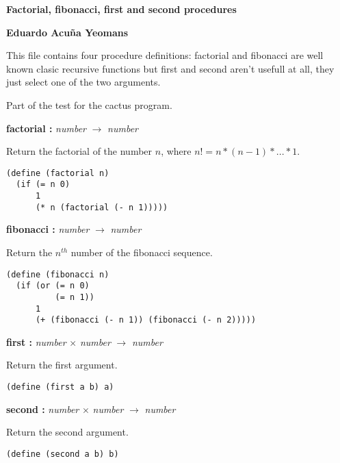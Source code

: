 \documentclass[letterpaper, 12pt]{article}
\begin{document}
\hfill {\LARGE \textbf{Factorial, fibonacci, first and second procedures} }

\bigskip


\hfill {\large \textbf{Eduardo Acuña Yeomans} }

\bigskip


\bigskip

This file contains four procedure definitions:
factorial and fibonacci are well known clasic recursive functions
but first and second aren't usefull at all, they just select one of
the two arguments.

Part of the test for the cactus program.

\bigskip


\bigskip

\bigskip

\textbf{factorial :} \emph{number} $\boldsymbol{\rightarrow}$ \emph{number}


Return the factorial of the number $n$, where
$n! = n*(n-1)*...*1$.
\begin{verbatim}
(define (factorial n)
  (if (= n 0)
      1
      (* n (factorial (- n 1)))))
\end{verbatim}


\bigskip

\bigskip

\textbf{fibonacci :} \emph{number} $\boldsymbol{\rightarrow}$ \emph{number}


Return the $n^{th}$ number of the fibonacci sequence.
\begin{verbatim}
(define (fibonacci n)
  (if (or (= n 0)
          (= n 1))
      1
      (+ (fibonacci (- n 1)) (fibonacci (- n 2)))))
\end{verbatim}


\bigskip

\bigskip

\textbf{first :} \emph{number} $\times$ \emph{number} $\boldsymbol{\rightarrow}$ \emph{number}


Return the first argument.
\begin{verbatim}
(define (first a b) a)
\end{verbatim}


\bigskip

\bigskip

\textbf{second :} \emph{number} $\times$ \emph{number} $\boldsymbol{\rightarrow}$ \emph{number}


Return the second argument.
\begin{verbatim}
(define (second a b) b)
\end{verbatim}
\end{document}
